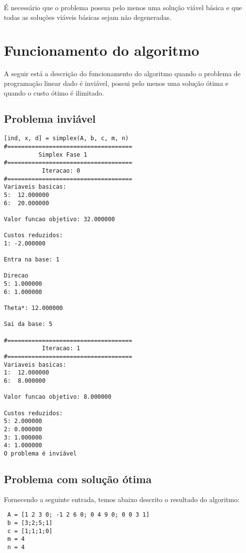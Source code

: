 \documentclass[
	12pt,				%
	openright,			%
	oneside,			%
	a4paper,			%
	english,			%
	french,				%
	spanish,			%
	brazil,				%
	]{abntex2}
\begin{document}
É necessário que o problema possua pelo menos uma solução viável básica e que todas as soluções viáveis básicas sejam não degeneradas.

\chapter{Funcionamento do algoritmo}

A seguir está a descrição do funcionamento do algoritmo quando o problema de
programação linear dado é inviável, possui pelo menos uma solução ótima e quando o custo 
ótimo é ilimitado.

\section{Problema inviável}

\begin{verbatim}
[ind, x, d] = simplex(A, b, c, m, n)
#====================================
          Simplex Fase 1
#====================================
           Iteracao: 0
#====================================
Variaveis basicas:
5:  12.000000
6:  20.000000

Valor funcao objetivo: 32.000000

Custos reduzidos:
1: -2.000000

Entra na base: 1

Direcao
5: 1.000000
6: 1.000000

Theta*: 12.000000

Sai da base: 5

#====================================
           Iteracao: 1
#====================================
Variaveis basicas:
1:  12.000000
6:  8.000000

Valor funcao objetivo: 8.000000

Custos reduzidos:
5: 2.000000
2: 0.000000
3: 1.000000
4: 1.000000
O problema é inviável 
\end{verbatim}


\section{Problema com solução ótima}
Fornecendo a seguinte entrada, temos abaixo descrito o resultado do algoritmo:

\begin{verbatim}
 A = [1 2 3 0; -1 2 6 0; 0 4 9 0; 0 0 3 1]
 b = [3;2;5;1]
 c = [1;1;1;0]
 m = 4
 n = 4
\end{verbatim}
\end{document}
